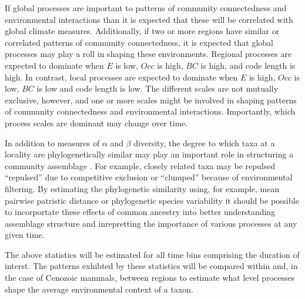\documentclass[12pt,letterpaper]{article}
\begin{document}
If global processes are important to patterns of community connectedness and environmental interactions than it is expected that these will be correlated with global climate measures. Additionally, if two or more regions have similar or correlated patterns of community connectedness, it is expected that global processes may play a roll in shaping these environments. Regional processes are expected to dominate when \(E\) is low, \(Occ\) is high, \(BC\) is high, and code length is high. In contrast, local processes are expected to dominate when \(E\) is high, \(Occ\) is low, \(BC\) is low and code length is low. The different scales are not mutually exclusive, however, and one or more scales might be involved in shaping patterns of community connectedness and environmental interactions. Importantly, which process scales are dominant may change over time.

In addition to measures of \(\alpha\) and \(\beta\) diversity, the degree to which taxa at a locality are phylogenetically similar may play an important role in structuring a community assemblage \citep{Webb2002}. For example, closely related taxa may be repulsed ``repulsed'' due to competitive exclusion or ``clumped'' because of environmental filtering. By estimating the phylogenetic similarity using, for example, mean pairwise patristic distance \citep{Webb2002} or phylogenetic species variability \citep{Helmus2007a} it should be possible to incorportate these effects of common ancestry into better understanding assemblage structure and inrepretting the importance of various processes at any given time.

The above statistics will be estimated for all time bins comprising the duration of interst. The patterns exhibted by these statistics will be compared within and, in the case of Cenozoic mammals, between regions to estimate what level processes shape the average environmental context of a taxon.


\clearpage


\end{document}
